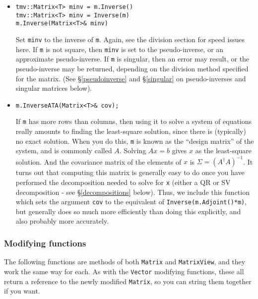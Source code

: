 \documentclass[twoside,letterpaper,11pt]{article}
\renewcommand{\tt}[1]{{\texttt {#1}}}
\begin{document}
\begin{itemize}
\item
\begin{verbatim}
tmv::Matrix<T> minv = m.Inverse()
tmv::Matrix<T> minv = Inverse(m)
m.Inverse(Matrix<T>& minv)
\end{verbatim}
Set \tt{minv} to the inverse of \tt{m}.  
Again, see the division section for speed issues here.
If \tt{m} is not square, then \tt{minv} is set to the pseudo-inverse, or an approximate
pseudo-inverse.  If \tt{m} is singular, then an error may result, or the pseudo-inverse
may be returned, depending on the division method specified for the matrix.  
(See \S\ref{pseudoinverse} and \S\ref{singular} 
on pseudo-inverses and singular matrices below).

\item
\begin{verbatim}
m.InverseATA(Matrix<T>& cov);
\end{verbatim}
If \tt{m} has more rows than columns, then using it to solve a system of equations
really amounts to finding the least-square solution, since there is (typically) no
exact solution.  When you do this, \tt{m} is known as the ``design matrix'' of the system,
and is commonly called $A$.  Solving $A x=b$ gives $x$ as the least-square 
solution.  And the covariance matrix of the elements of $x$ is 
$\Sigma = (A^\dagger A)^{-1}$.
It turns out that computing this matrix is generally easy to do once you have 
performed the decomposition needed to solve for \tt{x} (either a QR or SV 
decomposition - see \S\ref{decompositions} below).  
Thus, we include this function which sets the
argument \tt{cov} to the equivalent of \tt{Inverse(m.Adjoint()*m)}, 
but generally does so much more efficiently than doing this explicitly, 
and also probably more accurately.

\end{itemize}

\subsubsection{Modifying functions}

The following functions are methods of both \tt{Matrix} and \tt{MatrixView},
and they work the same way for each.
As with the \tt{Vector} modifying functions, these all return a reference
to the newly modified \tt{Matrix}, so you can string them together if you want.
\end{document}
